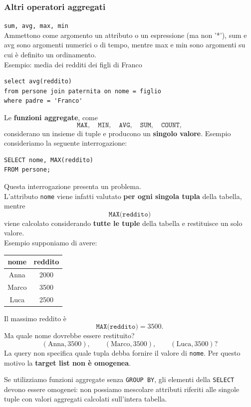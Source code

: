 \subsubsection{Altri operatori aggregati}
\texttt{sum, avg, max, min}\\
Ammettono come argomento un attributo o un espressione (ma non '*'), sum e avg sono argomenti numerici o di tempo, mentre max e min sono argomenti su cui è definito un ordinamento.\\
\textcolor{verdeEsempio}{Esempio:} media dei redditi dei figli di Franco
\begin{verbatim}
select avg(reddito)
from persone join paternita on nome = figlio
where padre = 'Franco'
\end{verbatim}

\noindent Le \textbf{funzioni aggregate}, come
\[
\texttt{MAX}, \quad \texttt{MIN}, \quad \texttt{AVG}, \quad
\texttt{SUM}, \quad \texttt{COUNT},
\]
considerano un insieme di tuple e producono un \textbf{singolo valore}.
\textcolor{verdeEsempio}{Esempio} consideriamo la seguente interrogazione:
\begin{verbatim}
SELECT nome, MAX(reddito)
FROM persone;
\end{verbatim}
Questa interrogazione presenta un problema.\\
L'attributo \texttt{nome} viene infatti valutato \textbf{per ogni
singola tupla} della tabella, mentre
\[
\texttt{MAX(reddito)}
\]
viene calcolato considerando \textbf{tutte le tuple} della tabella e
restituisce un solo valore.\\
\textcolor{verdeEsempio}{Esempio} supponiamo di avere:
\begin{center}
\begin{tabular}{|c|c|}
\hline
\textbf{nome} & \textbf{reddito} \\ \hline
Anna   & 2000 \\ \hline
Marco  & 3500 \\ \hline
Luca   & 2500 \\ \hline
\end{tabular}
\end{center}
Il massimo reddito è
\[
\texttt{MAX(reddito)} = 3500.
\]
Ma quale nome dovrebbe essere restituito?
\[
(\text{Anna},3500), \qquad
(\text{Marco},3500), \qquad
(\text{Luca},3500)?
\]
La query non specifica quale tupla debba fornire il valore di
\texttt{nome}. Per questo motivo la \textbf{target list non è
omogenea}.\\
\noindent
\colorbox{SALZO}{\parbox{\dimexpr\linewidth-2\fboxsep}{\begin{regola}
Se utilizziamo funzioni aggregate senza \texttt{GROUP BY}, gli
elementi della \texttt{SELECT} devono essere omogenei: non possiamo
mescolare attributi riferiti alle singole tuple con valori aggregati
calcolati sull'intera tabella.\end{regola}}}\\
